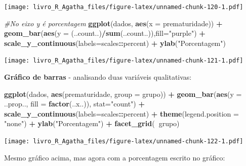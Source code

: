 \documentclass[
]{book}
\newenvironment{Shaded}{\begin{snugshade}}{\end{snugshade}}
\newcommand{\CommentTok}[1]{\textcolor[rgb]{0.56,0.35,0.01}{\textit{#1}}}
\newcommand{\DataTypeTok}[1]{\textcolor[rgb]{0.13,0.29,0.53}{#1}}
\newcommand{\KeywordTok}[1]{\textcolor[rgb]{0.13,0.29,0.53}{\textbf{#1}}}
\newcommand{\NormalTok}[1]{#1}
\newcommand{\OperatorTok}[1]{\textcolor[rgb]{0.81,0.36,0.00}{\textbf{#1}}}
\newcommand{\StringTok}[1]{\textcolor[rgb]{0.31,0.60,0.02}{#1}}
\begin{document}
\texttt{[image: livro\_R\_Agatha\_files/figure-latex/unnamed-chunk-120-1.pdf]}

\begin{Shaded}
\begin{Highlighting}[]
\CommentTok{#No eixo y é porcentagem}
\KeywordTok{ggplot}\NormalTok{(dados, }\KeywordTok{aes}\NormalTok{(}\DataTypeTok{x =}\NormalTok{ prematuridade)) }\OperatorTok{+}\StringTok{  }
\StringTok{  }\KeywordTok{geom_bar}\NormalTok{(}\KeywordTok{aes}\NormalTok{(}\DataTypeTok{y =}\NormalTok{ (..count..)}\OperatorTok{/}\KeywordTok{sum}\NormalTok{(..count..)),}\DataTypeTok{fill=}\StringTok{"purple"}\NormalTok{) }\OperatorTok{+}\StringTok{ }
\StringTok{  }\KeywordTok{scale_y_continuous}\NormalTok{(}\DataTypeTok{labels=}\NormalTok{scales}\OperatorTok{::}\NormalTok{percent) }\OperatorTok{+}
\StringTok{  }\KeywordTok{ylab}\NormalTok{(}\StringTok{"Porcentagem"}\NormalTok{)}
\end{Highlighting}
\end{Shaded}

\texttt{[image: livro\_R\_Agatha\_files/figure-latex/unnamed-chunk-121-1.pdf]}

\textbf{Gráfico de barras} - analisando duas variáveis qualitativas:

\begin{Shaded}
\begin{Highlighting}[]
\KeywordTok{ggplot}\NormalTok{(dados, }\KeywordTok{aes}\NormalTok{(prematuridade, }\DataTypeTok{group =}\NormalTok{ grupo)) }\OperatorTok{+}\StringTok{ }
\StringTok{  }\KeywordTok{geom_bar}\NormalTok{(}\KeywordTok{aes}\NormalTok{(}\DataTypeTok{y =}\NormalTok{ ..prop.., }\DataTypeTok{fill =} \KeywordTok{factor}\NormalTok{(..x..)), }\DataTypeTok{stat=}\StringTok{"count"}\NormalTok{) }\OperatorTok{+}\StringTok{ }
\StringTok{  }\KeywordTok{scale_y_continuous}\NormalTok{(}\DataTypeTok{labels=}\NormalTok{scales}\OperatorTok{::}\NormalTok{percent) }\OperatorTok{+}
\StringTok{  }\KeywordTok{theme}\NormalTok{(}\DataTypeTok{legend.position =} \StringTok{"none"}\NormalTok{) }\OperatorTok{+}
\StringTok{  }\KeywordTok{ylab}\NormalTok{(}\StringTok{"Porcentagem"}\NormalTok{) }\OperatorTok{+}
\StringTok{  }\KeywordTok{facet_grid}\NormalTok{(}\OperatorTok{~}\NormalTok{grupo)}
\end{Highlighting}
\end{Shaded}

\texttt{[image: livro\_R\_Agatha\_files/figure-latex/unnamed-chunk-122-1.pdf]}

Mesmo gráfico acima, mas agora com a porcentagem escrito no gráfico:
\end{document}
